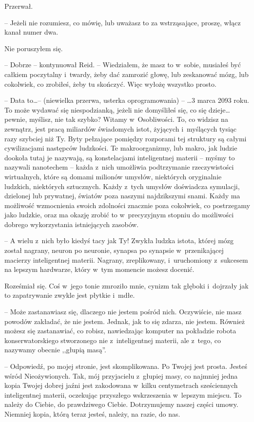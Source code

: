 \documentclass[oneside,polish,11pt,sfheadings]{mwbk}
\begin{document}
Przerwał. 

-- Jeżeli nie rozumiesz, co mówię, lub uważasz to za
wstrząsające, proszę, włącz kanał numer dwa.

Nie poruszyłem się.

-- Dobrze -- kontynuował Reid. -- Wiedziałem, że masz to w~sobie, musiałeś
być całkiem poczytalny i~twardy, żeby dać zamrozić głowę, lub zeskanować
mózg, lub cokolwiek, co zrobiłeś, żeby tu skończyć. Więc wyłożę wszystko
prosto.

-- Data to\ldots -- (niewielka przerwa, usterka oprogramowania) -- \ldots 3 marca
2093 roku. To może wydawać się niespodzianką, jeżeli nie domyśliłeś się,
co się dzieje\ldots pewnie, myślisz, nie tak szybko? Witamy w~Osobliwości.
To, co widzisz na zewnątrz, jest pracą miliardów świadomych istot,
żyjących i~myślących tysiąc razy szybciej niż Ty. Byty pełzające
pomiędzy rozporami tej struktury są całymi cywilizacjami następców
ludzkości. Te makroorganizmy, lub makro, jak ludzie dookoła tutaj je
nazywają, są konstelacjami inteligentnej materii -- myśmy to nazywali
nanotechem -- każda z~nich umożliwia podtrzymanie rzeczywistości
wirtualnych, które są domami milionów umysłów, niektórych oryginalnie
ludzkich, niektórych sztucznych. Każdy z~tych umysłów doświadcza
symulacji, dzielonej lub prywatnej, światów poza naszymi najdzikszymi
snami. Każdy ma możliwość wzmocnienia swoich zdolności znacznie poza
cokolwiek, co postrzegamy jako ludzkie, oraz ma okazję zrobić to w~precyzyjnym stopniu do możliwości dobrego wykorzystania istniejących
zasobów.

-- A wielu z~nich było kiedyś tacy jak Ty! Zwykła ludzka istota, której
mózg został nagrany, neuron po neuronie, synapsa po synapsie w~przenikającej macierzy inteligentnej materii. Nagrany, zreplikowany, i~uruchomiony z~sukcesem na lepszym hardwarze, który w~tym momencie możesz
docenić.

Roześmiał się. Coś w~jego tonie zmroziło mnie, cynizm tak głęboki i~dojrzały jak to zapatrywanie zwykle jest płytkie i~mdłe.

-- Może zastanawiasz się, dlaczego nie jestem pośród nich. Oczywiście,
nie masz powodów zakładać, że nie jestem. Jednak, jak to się zdarza, nie
jestem. Również możesz się zastanawiać, co robisz, nawiedzając komputer
na pokładzie robota konserwatorskiego stworzonego nie z~inteligentnej
materii, ale z~tego, co nazywamy obecnie ,,głupią masą''.

-- Odpowiedź, po mojej stronie, jest skomplikowana. Po Twojej jest
prosta. Jesteś wśród Nieożywionych. Tak, mój przyjacielu z~głupiej masy,
co najmniej jedna kopia Twojej dobrej jaźni jest zakodowana w~kilku
centymetrach sześciennych inteligentnej materii, oczekując przyszłego
wskrzeszenia w~lepszym miejscu. To należy do Ciebie, do prawdziwego
Ciebie. Dotrzymujemy naszej części umowy. Niemniej kopia, którą teraz
jesteś, należy, na razie, do nas.
\end{document}
